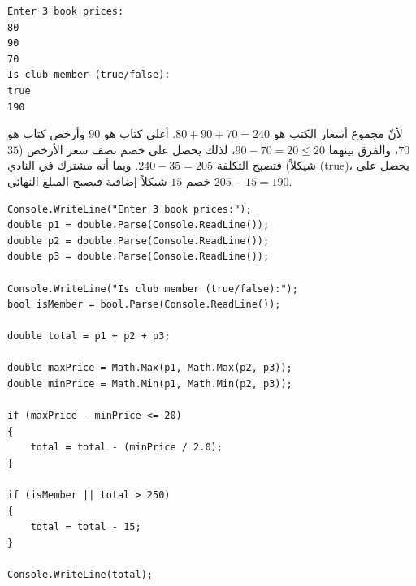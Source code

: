 \documentclass[14pt]{extarticle}
\begin{document}
\begin{enumerate}[resume, itemsep=2.2em]
\ifdetailed
\begin{boxExample}
\begin{english}
\begin{verbatim}
Enter 3 book prices:
80
90
70
Is club member (true/false):
true
190
\end{verbatim}
\end{english}
\end{boxExample}
لأنّ مجموع أسعار الكتب هو $80 + 90 + 70 = 240$. أغلى كتاب هو $90$ وأرخص كتاب هو $70$، والفرق بينهما $90 - 70 = 20 \le 20$، لذلك يحصل على خصم نصف سعر الأرخص ($35$ شيكلاً) فتصبح التكلفة $240 - 35 = 205$. وبما أنه مشترك في النادي (\textenglish{true})، يحصل على خصم $15$ شيكلاً إضافية فيصبح المبلغ النهائي $205 - 15 = 190$.
\fi

\ifwithsols
\begin{boxSolution}
\begin{english}
\begin{verbatim}
Console.WriteLine("Enter 3 book prices:");
double p1 = double.Parse(Console.ReadLine());
double p2 = double.Parse(Console.ReadLine());
double p3 = double.Parse(Console.ReadLine());

Console.WriteLine("Is club member (true/false):");
bool isMember = bool.Parse(Console.ReadLine());

double total = p1 + p2 + p3;

double maxPrice = Math.Max(p1, Math.Max(p2, p3));
double minPrice = Math.Min(p1, Math.Min(p2, p3));

if (maxPrice - minPrice <= 20)
{
    total = total - (minPrice / 2.0);
}

if (isMember || total > 250)
{
    total = total - 15;
}

Console.WriteLine(total);
\end{verbatim}
\end{english}
\end{boxSolution}
\fi
\filbreak


\end{enumerate}
\end{document}

